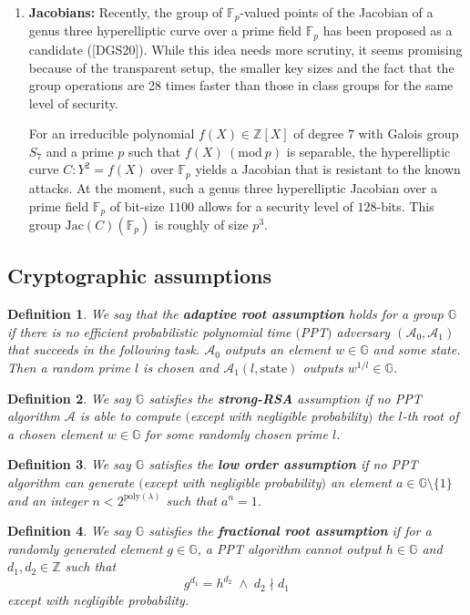 \documentclass[11pt, lettersize, notitlepage, leqno, footskip=0.6cm]{article}
\newcommand{\bz}{\mathbb Z}
\newcommand{\bFp}{\mathbb{F}_p}
\newcommand{\mc}{\mathcal}
\newcommand{\mb}{\mathbb}
\newcommand{\mr}{\mathrm}
\newcommand{\Jac}{\mr{Jac}}
\newcommand{\lam}{\lambda}
\newcommand{\vs}{\vspace{-0.15cm}}
\newcommand{\Mod}[1]{\ (\mathrm{mod}\ #1)}
\newtheorem{Def}{Definition}[section]
\numberwithin{equation}{section}
\begin{document}
\begin{enumerate}[wide, labelwidth=!, labelindent=0pt]
\item \textbf{Jacobians:} Recently, the group of $\bFp$-valued points of the Jacobian of a genus three hyperelliptic curve over a prime field $\bFp$ has been proposed as a candidate ([DGS20]). While this idea needs more scrutiny, it seems promising because of the transparent setup, the smaller key sizes and the fact that the group operations are 28 times faster than those in class groups for the same level of security.

For an irreducible polynomial $f(X)\in \bz[X]$ of degree $7$ with Galois group $S_7$ and a prime $p$ such that $f(X)\Mod{p}$ is separable, the hyperelliptic curve $C:Y^2 = f(X)$ over $\bFp$ yields a Jacobian that is resistant to the known attacks. At the moment, such a genus three hyperelliptic Jacobian over a prime field $\bFp$ of bit-size $1100$ allows for a security level of $128$-bits. This group $\Jac(C)(\bFp)$ is roughly of size $p^3$. \end{enumerate}


\subsection{\fontsize{11}{11} Cryptographic assumptions}

\begin{Def} We say that the \textbf{adaptive root assumption} holds for a group $\mb{G}$ if there is no efficient probabilistic polynomial time $($PPT$)$ adversary $(\mc{A}_0, \mc{A}_1)$ that succeeds in the following task. $\mc{A}_0$ outputs an element $w\in \mb{G}$ and some state. Then a random prime $l$ is chosen and $\mc{A}_1(l, \mr{state})$ outputs $w^{1/l}\in \mb{G}$. \end{Def}
 

\begin{Def} We say $\mb{G}$ satisfies the \textbf{strong-RSA} assumption if no PPT algorithm $\mc{A}$ is able to compute $($except with negligible probability$)$ the $l$-th root of a chosen element $w\in \mb{G}$ for some randomly chosen prime $l$.\end{Def}

\begin{Def} We say $\mb{G}$ satisfies the \textbf{low order assumption} if no PPT algorithm can generate $($except with negligible probability$)$ an element $a\in\mb{G}\setminus\{1\}$ and an integer $n< 2^{\mr{poly}(\lam)}$ such that $a^n = 1$.\end{Def}

\begin{Def} We say $\mb{G}$ satisfies the \textbf{fractional root assumption} if for a randomly generated element $g\in \mb{G}$, a PPT algorithm cannot output $h\in\mb{G}$ and $d_1,d_2\in\bz$ such that \vs $$g^{d_1} = h^{d_2}\;\wedge\; d_2 \nmid d_1$$ except with negligible probability.\end{Def}
\end{document}
